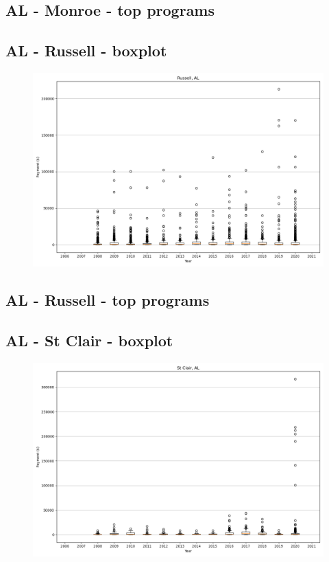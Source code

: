 \subsection*{AL - Monroe - top programs}

\newpage
\subsection*{AL - Russell - boxplot}
\begin{figure}[h]
\centering
\includegraphics[width=7in]{../output/boxplots/counties/Russell-AL_boxplot.png}
\end{figure}


\subsection*{AL - Russell - top programs}

\newpage
\subsection*{AL - St Clair - boxplot}
\begin{figure}[h]
\centering
\includegraphics[width=7in]{../output/boxplots/counties/St Clair-AL_boxplot.png}
\end{figure}


